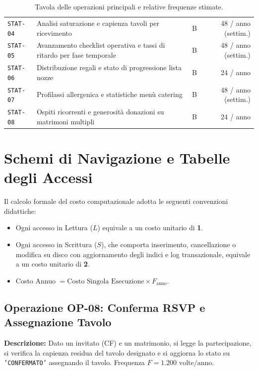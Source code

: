 \begin{table}[h!]
\begin{tabularx}{\textwidth}{l p{7.5cm} c r}
\texttt{STAT-04}& Analisi saturazione e capienza tavoli per ricevimento & B & 48 / anno (settim.) \\
\texttt{STAT-05}& Avanzamento checklist operativa e tassi di ritardo per fase temporale & B & 48 / anno (settim.) \\
\texttt{STAT-06}& Distribuzione regali e stato di progressione lista nozze & B & 24 / anno \\
\texttt{STAT-07}& Profilassi allergenica e statistiche menù catering & B & 48 / anno (settim.) \\
\texttt{STAT-08}& Ospiti ricorrenti e generosità donazioni su matrimoni multipli & B & 24 / anno \\
\bottomrule
\end{tabularx}
\caption{Tavola delle operazioni principali e relative frequenze stimate.}
\label{tab:operazioni}
\end{table}

\section{Schemi di Navigazione e Tabelle degli Accessi}
Il calcolo formale del costo computazionale adotta le seguenti convenzioni didattiche:
\begin{itemize}[noitemsep]
    \item Ogni accesso in Lettura ($L$) equivale a un costo unitario di \textbf{1}.
    \item Ogni accesso in Scrittura ($S$), che comporta inserimento, cancellazione o modifica su disco con aggiornamento degli indici e log transazionale, equivale a un costo unitario di \textbf{2}.
    \item Costo Annuo $= \text{Costo Singola Esecuzione} \times F_{\text{anno}}$.
\end{itemize}

\subsection{Operazione OP-08: Conferma RSVP e Assegnazione Tavolo}
\textbf{Descrizione:} Dato un invitato (CF) e un matrimonio, si legge la partecipazione, si verifica la capienza residua del tavolo designato e si aggiorna lo stato su \texttt{'CONFERMATO'} assegnando il tavolo. Frequenza $F = 1.200 \text{ volte/anno}$.

